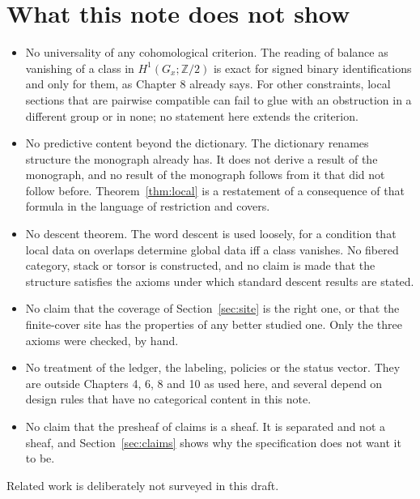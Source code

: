 \documentclass[11pt]{article}
\theoremstyle{plain}
\theoremstyle{definition}
\theoremstyle{remark}
\newcommand{\Zt}{\mathbb{Z}/2}
\begin{document}
\section{What this note does not show}\label{sec:limits}

\begin{itemize}[nosep]
\item No universality of any cohomological criterion. The reading of balance as vanishing of a class in $H^1(G_x;\Zt)$ is exact for signed binary identifications and only for them, as Chapter 8 already says. For other constraints, local sections that are pairwise compatible can fail to glue with an obstruction in a different group or in none; no statement here extends the criterion.
\item No predictive content beyond the dictionary. The dictionary renames structure the monograph already has. It does not derive a result of the monograph, and no result of the monograph follows from it that did not follow before. Theorem~\ref{thm:local} is a restatement of a consequence of that formula in the language of restriction and covers.
\item No descent theorem. The word descent is used loosely, for a condition that local data on overlaps determine global data iff a class vanishes. No fibered category, stack or torsor is constructed, and no claim is made that the structure satisfies the axioms under which standard descent results are stated.
\item No claim that the coverage of Section~\ref{sec:site} is the right one, or that the finite-cover site has the properties of any better studied one. Only the three axioms were checked, by hand.
\item No treatment of the ledger, the labeling, policies or the status vector. They are outside Chapters 4, 6, 8 and 10 as used here, and several depend on design rules that have no categorical content in this note.
\item No claim that the presheaf of claims is a sheaf. It is separated and not a sheaf, and Section~\ref{sec:claims} shows why the specification does not want it to be.
\end{itemize}

Related work is deliberately not surveyed in this draft.
\end{document}
